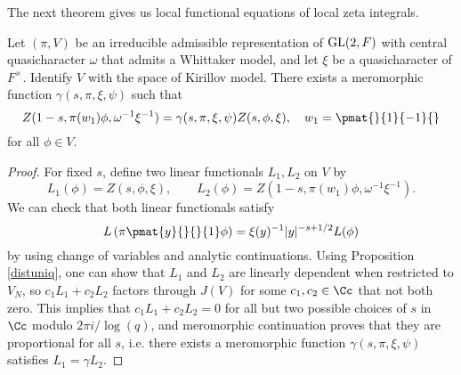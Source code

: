 The next theorem gives us local functional equations of local zeta integrals.
\begin{theorem}
\label{localfe}
Let $(\pi, V)$ be an irreducible admissible representation of $\mathrm{GL}(2, F)$ with central quasicharacter $\omega$ that admits a Whittaker model, and let $\xi$ be a quasicharacter of $F^{\times}$. 
Identify $V$ with the space of Kirillov model. 
There exists a meromorphic function $\gamma(s, \pi, \xi, \psi)$ such that 
$$
Z(1-s, \pi(w_1)\phi, \omega^{-1}\xi^{-1}) = \gamma(s, \pi, \xi, \psi) Z(s, \phi, \xi), \quad w_1 = \pmat{}{1}{-1}{}
$$
for all $\phi\in V$. 
\end{theorem}
\begin{proof}
For fixed $s$, define two linear functionals $L_1, L_2$ on $V$ by 
$$
L_1(\phi) = Z(s, \phi, \xi), \qquad L_2(\phi) = Z(1-s, \pi(w_1)\phi, \omega^{-1}\xi^{-1}).
$$
We can check that both linear functionals satisfy 
$$
L\left( \pi\pmat{y}{}{}{1} \phi\right) = \xi(y)^{-1}|y|^{-s+1/2} L(\phi)
$$
by using change of variables and analytic continuations. 
Using Proposition \ref{distuniq}, one can show that $L_{1}$ and $L_{2}$ are linearly dependent when restricted to $V_N$, so $c_1 L_1 + c_2 L_2$ factors through $J(V)$ for some $c_1, c_2\in \Cc$ that not both zero. 
This implies that $c_1 L_1 + c_2 L_2 = 0$ for all but two possible choices of $s$ in $\Cc$ modulo $2\pi i / \log (q)$, and meromorphic continuation proves that they are proportional for all $s$, i.e. there exists a meromorphic function $\gamma(s, \pi, \xi, \psi)$ satisfies $L_{1} = \gamma L_{2}$. 
\end{proof}

